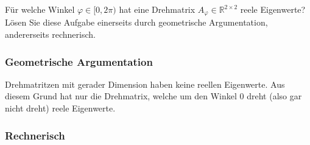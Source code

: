 Für welche Winkel $\varphi \in [0, 2\pi)$ hat eine Drehmatrix $A_\varphi \in
    \mathbb{R}^{2 \times 2}$ reele Eigenwerte? Lösen Sie diese Aufgabe einerseits
durch geometrische Argumentation, andererseits rechnerisch.

\subsubsection*{Geometrische Argumentation}

Drehmatritzen mit gerader Dimension haben keine reellen Eigenwerte. Aus diesem
Grund hat nur die Drehmatrix, welche um den Winkel 0 dreht (also gar nicht
dreht) reele Eigenwerte.

\subsubsection*{Rechnerisch}


